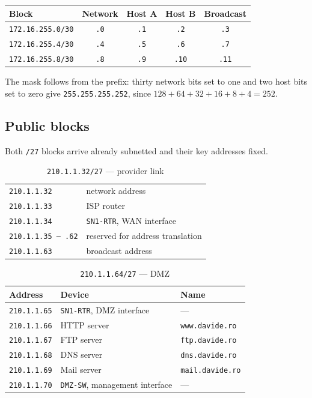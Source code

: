 \documentclass[12pt,a4paper]{article}
\begin{document}
\begin{table}[H]
\centering
\begin{tabular}{@{} l c c c c @{}}
\toprule
\textbf{Block} & \textbf{Network} & \textbf{Host A} & \textbf{Host B} & \textbf{Broadcast} \\
\midrule
\texttt{172.16.255.0/30} & \texttt{.0} & \texttt{.1} & \texttt{.2}  & \texttt{.3}  \\
\texttt{172.16.255.4/30} & \texttt{.4} & \texttt{.5} & \texttt{.6}  & \texttt{.7}  \\
\texttt{172.16.255.8/30} & \texttt{.8} & \texttt{.9} & \texttt{.10} & \texttt{.11} \\
\bottomrule
\end{tabular}
\end{table}

The mask follows from the prefix: thirty network bits set to one and two host
bits set to zero give \texttt{255.255.255.252}, since
$128+64+32+16+8+4 = 252$.

\subsection{Public blocks}

Both \texttt{/27} blocks arrive already subnetted and their key addresses fixed.

\begin{table}[H]
\centering
\caption{\texttt{210.1.1.32/27} --- provider link}
\begin{tabular}{@{} l l @{}}
\toprule
\texttt{210.1.1.32}        & network address \\
\texttt{210.1.1.33}        & ISP router \\
\texttt{210.1.1.34}        & \texttt{SN1-RTR}, WAN interface \\
\texttt{210.1.1.35 -- .62} & reserved for address translation \\
\texttt{210.1.1.63}        & broadcast address \\
\bottomrule
\end{tabular}
\end{table}

\begin{table}[H]
\centering
\caption{\texttt{210.1.1.64/27} --- DMZ}
\begin{tabular}{@{} l l l @{}}
\toprule
\textbf{Address} & \textbf{Device} & \textbf{Name} \\
\midrule
\texttt{210.1.1.65} & \texttt{SN1-RTR}, DMZ interface & --- \\
\texttt{210.1.1.66} & HTTP server & \texttt{www.davide.ro} \\
\texttt{210.1.1.67} & FTP server  & \texttt{ftp.davide.ro} \\
\texttt{210.1.1.68} & DNS server  & \texttt{dns.davide.ro} \\
\texttt{210.1.1.69} & Mail server & \texttt{mail.davide.ro} \\
\texttt{210.1.1.70} & \texttt{DMZ-SW}, management interface & --- \\
\bottomrule
\end{tabular}
\end{table}
\end{document}
